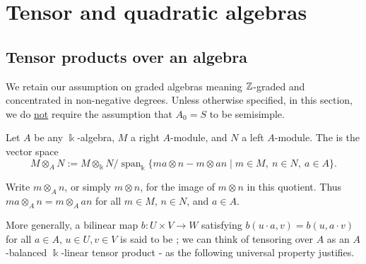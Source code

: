 \section{Tensor and quadratic algebras}


\subsection{Tensor products over an algebra}

We retain our assumption on graded algebras meaning $\mathbb{Z}$-graded and concentrated in non-negative degrees.  Unless otherwise specified, in this section, we do 
\underline{not} require the assumption that $A_0=S$ to be semisimple.

\begin{definition}\label{def:module-tensor}
Let $A$ be any $\Bbbk$-algebra, $M$ a right $A$-module, and $N$ a left $A$-module.
The  is the vector space
\[
M\otimes_A N := M\otimes_\Bbbk N/\operatorname{span}_\Bbbk\{ma\otimes n-m\otimes an\mid m\in M,\ n\in N,\ a\in A\}.
\]
\end{definition}

Write $m\otimes_A n$, or simply $m\otimes n$, for the image of $m\otimes n$ in this quotient.
Thus $ma\otimes_A n=m\otimes_A an$ for all $m\in M$, $n\in N$, and $a\in A$.

More generally, a bilinear map $b:U\times V\to W$ satisfying $b(u\cdot a, v)=b(u,a\cdot v)$ for all $a\in A$, $u\in U, v\in V$ is said to be ; we can think of tensoring over $A$ as an $A$-balanced $\Bbbk$-linear tensor product - as the following universal property justifies.



